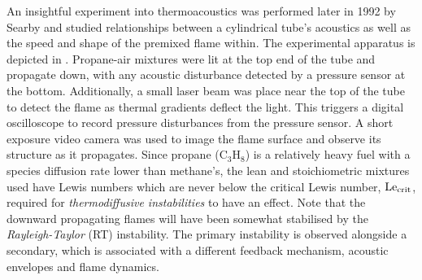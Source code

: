 An insightful experiment into thermoacoustics was performed later in 1992 by Searby \cite{searby1992AcousticInstabilityPremixed} and studied relationships between a cylindrical tube's acoustics as well as the speed and shape of the premixed flame within. The experimental apparatus is depicted in . Propane-air mixtures were lit at the top end of the tube and propagate down, with any acoustic disturbance detected by a pressure sensor at the bottom. Additionally, a small laser beam was place near the top of the tube to detect the flame as thermal gradients deflect the light. This triggers a digital oscilloscope to record pressure disturbances from the pressure sensor. A short exposure video camera was used to image the flame surface and observe its structure as it propagates. Since propane (C$_3$H$_8$) is a relatively heavy fuel with a species diffusion rate lower than methane's, the lean and stoichiometric mixtures used have Lewis numbers which are never below the critical Lewis number, $\mathrm{Le}_\mathrm{crit}$, required for \emph{thermodiffusive instabilities} \cite{zeldovich1944TheoryCombustionDetonation,barenblatt1962DiffusionalThermalStabilityLaminar,sivashinsky1977DiffusionalThermalTheoryCellular} to have an effect. Note that the downward propagating flames will have been somewhat stabilised by the \emph{Rayleigh-Taylor} (RT) instability. The primary instability is observed alongside a secondary, which is associated with a different feedback mechanism, acoustic envelopes and flame dynamics.

